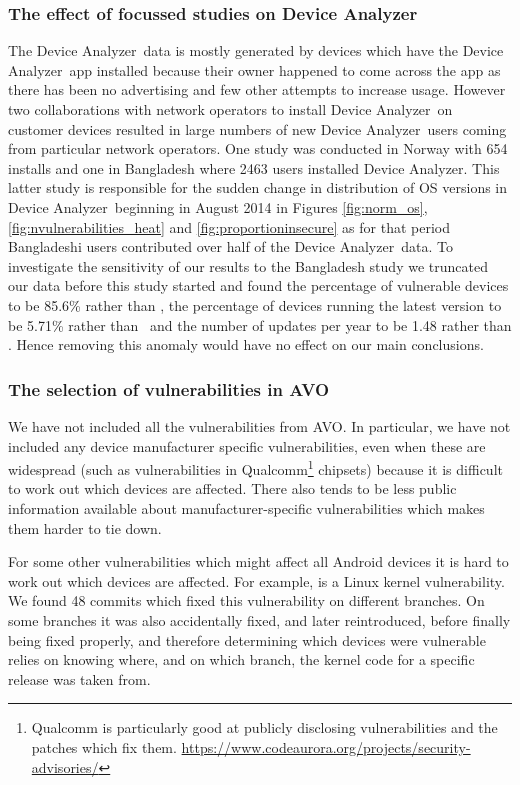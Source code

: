 \documentclass{llncs}
\makeatletter
\newcommand{\da}{Device Analyzer}
\newcommand{\avo}{AVO}
\def\avovuln{\@ifnextchar[{\@avovulnsspecific}{\@avovulngeneral}}
\def\@avovulnsspecific[#1]#2{\emph{\href{http://androidvulnerabilities.org/vulnerabilities/#1}{#2}}}
\def\@avovulngeneral#1{\emph{\href{http://androidvulnerabilities.org/vulnerabilities/#1}{#1}}}
\makeatother
\begin{document}
\subsubsection{The effect of focussed studies on \da}
\label{sec:da_changes}
The \da\ data is mostly generated by devices which have the \da\ app installed because their owner happened to come across the app as there has been no advertising and few other attempts to increase usage.
However two collaborations with network operators to install \da\ on customer devices resulted in large numbers of new \da\ users coming from particular network operators.
One study was conducted in Norway with 654 installs and one in Bangladesh where 2463 users installed \da.
This latter study is responsible for the sudden change in distribution of OS versions in \da\ beginning in August 2014 in Figures \ref{fig:norm_os}, \ref{fig:nvulnerabilities_heat} and \ref{fig:proportioninsecure} as for that period Bangladeshi users contributed over half of the \da\ data.
To investigate the sensitivity of our results to the Bangladesh study we truncated our data before this study started and found the percentage of vulnerable devices to be 85.6\% rather than \daMeanInsecurityPercNominal, the percentage of devices running the latest version to be 5.71\% rather than \daUpdatednessPercNominal\ and the number of updates per year to be 1.48 rather than \daUpdatesPerYearNominal.
Hence removing this anomaly would have no effect on our main conclusions.

\subsubsection{The selection of vulnerabilities in \avo}
We have not included all the vulnerabilities from \avo. 
In particular, we have not included any device manufacturer specific vulnerabilities, even when these are widespread (such as vulnerabilities in Qualcomm\footnote{Qualcomm is particularly good at publicly disclosing vulnerabilities and the patches which fix them. \url{https://www.codeaurora.org/projects/security-advisories/}} chipsets) because it is difficult to work out which devices are affected.
There also tends to be less public information available about manufacturer-specific vulnerabilities which makes them harder to tie down.

For some other vulnerabilities which might affect all Android devices it is hard to work out which devices are affected.
For example, \avovuln[pty_race]{pty race} is a Linux kernel vulnerability. We found 48 commits which fixed this vulnerability on different branches. On some branches it was also accidentally fixed, and later reintroduced, before finally being fixed properly, and therefore determining which devices were vulnerable relies on knowing where, and on which branch, the kernel code for a specific release was taken from.
\end{document}
